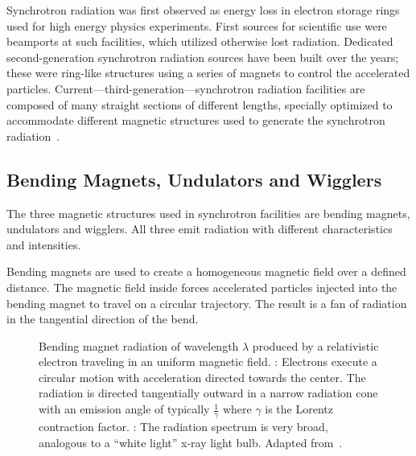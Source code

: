 Synchrotron radiation was first observed as energy loss in electron storage rings used for high energy physics experiments. First sources for scientific use were beamports at such facilities, which utilized otherwise lost radiation. Dedicated second-generation synchrotron radiation sources have been built over the years; these were ring-like structures using a series of magnets to control the accelerated particles. Current---third-generation---synchrotron radiation facilities are composed of many straight sections of different lengths, specially optimized to accommodate different magnetic structures used to generate the synchrotron radiation~\cite{Stampanoni2002a,Margaritondo2002,wwwsls}. 

\subsection{Bending Magnets, Undulators and Wigglers}
The three magnetic structures used in synchrotron facilities are bending magnets, undulators and wigglers. All three emit radiation with different characteristics and intensities.

Bending magnets are used to create a homogeneous magnetic field over a defined distance. The magnetic field inside forces accelerated particles injected into the bending magnet to travel on a circular trajectory. The result is a fan of radiation in the tangential direction of the bend.

\begin{figure}[htb]
	\noindent{}
	\caption[Bending magnet radiation]{Bending magnet radiation of wavelength $\lambda$ produced by a relativistic electron traveling in an uniform magnetic field. %
		: Electrons execute a circular motion with acceleration directed towards the center. The radiation is directed tangentially outward in a narrow radiation cone with an emission angle of typically $\frac{1}{\gamma}$ where $\gamma$ is the Lorentz contraction factor. %
		: The radiation spectrum is very broad, analogous to a ``white light'' x-ray light bulb.%
		Adapted from~\cite{Attwood2007}.}%
	\label{fig:bending magnets}
\end{figure}

